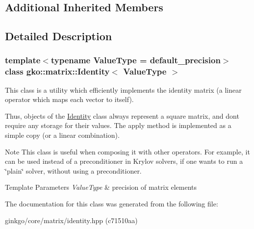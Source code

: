 \subsection*{Additional Inherited Members}


\subsection{Detailed Description}
\subsubsection*{template$<$typename Value\+Type = default\+\_\+precision$>$\newline
class gko\+::matrix\+::\+Identity$<$ Value\+Type $>$}

This class is a utility which efficiently implements the identity matrix (a linear operator which maps each vector to itself). 

Thus, objects of the \hyperlink{classgko_1_1matrix_1_1Identity}{Identity} class always represent a square matrix, and don\textquotesingle{}t require any storage for their values. The apply method is implemented as a simple copy (or a linear combination).

\begin{DoxyNote}{Note}
This class is useful when composing it with other operators. For example, it can be used instead of a preconditioner in Krylov solvers, if one wants to run a \char`\"{}plain\char`\"{} solver, without using a preconditioner.
\end{DoxyNote}

\begin{DoxyTemplParams}{Template Parameters}
{\em Value\+Type} & precision of matrix elements \\
\hline
\end{DoxyTemplParams}


The documentation for this class was generated from the following file\+:\begin{DoxyCompactItemize}
\item 
ginkgo/core/matrix/identity.\+hpp (c71510aa)\end{DoxyCompactItemize}
